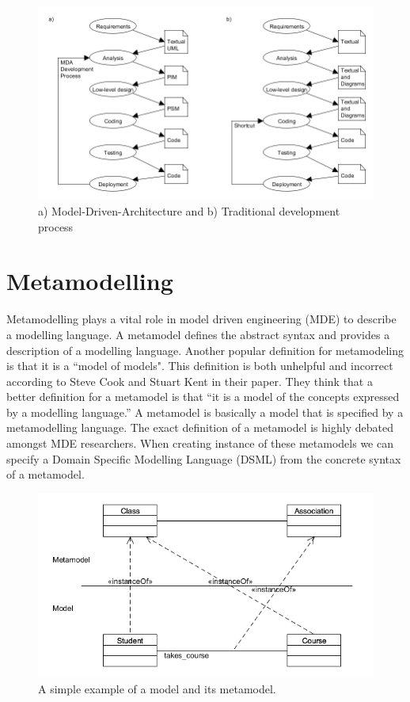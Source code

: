 \begin{figure}[H]
	\centering
	\includegraphics[scale=0.5]{./Figures/MDA.png}
	\caption[Software Development with MDA]
	{a) Model-Driven-Architecture and b) Traditional development process}
	\label{fig:MDA}
\end{figure}



\section{Metamodelling}

Metamodelling plays a vital role in model driven engineering (MDE) to describe a
modelling language. A metamodel defines the abstract syntax and provides a
description of a modelling language. Another popular definition for
metamodeling is that it is a ``model of models". This definition is both
unhelpful and incorrect according to Steve Cook and Stuart Kent in their
paper\cite{Cook2008}. They think that a better definition for a metamodel is
that ``it is a model of the concepts expressed by a modelling language.'' A
metamodel is basically a model that is specified by a metamodelling language.
The exact definition of a metamodel is highly debated amongst MDE
researchers\cite{Rutle}. When creating instance of these metamodels we can
specify a Domain Specific Modelling Language (DSML) from the concrete syntax of
a metamodel.

\begin{figure}[H]
	\centering
	\includegraphics[scale=0.6]{./Figures/SimpleMetamodel.png}
	\caption[Example of a model and metamodel]
	{A simple example of a model and its metamodel.}
	\label{fig:SimpleMetamodel}
\end{figure}

